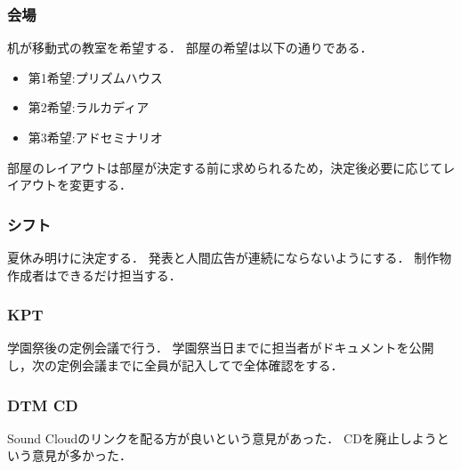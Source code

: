 \subsubsection*{会場}
机が移動式の教室を希望する．
部屋の希望は以下の通りである．
\begin{itemize}
    \item 第1希望:プリズムハウス
    \item 第2希望:ラルカディア
    \item 第3希望:アドセミナリオ  
\end{itemize}
部屋のレイアウトは部屋が決定する前に求められるため，決定後必要に応じてレイアウトを変更する．
    
\subsubsection*{シフト}
夏休み明けに決定する．
発表と人間広告が連続にならないようにする．
制作物作成者はできるだけ担当する．

\subsubsection*{KPT}
学園祭後の定例会議で行う．
学園祭当日までに担当者がドキュメントを公開し，次の定例会議までに全員が記入してで全体確認をする．

\subsubsection*{DTM CD}
Sound Cloudのリンクを配る方が良いという意見があった．
CDを廃止しようという意見が多かった．

